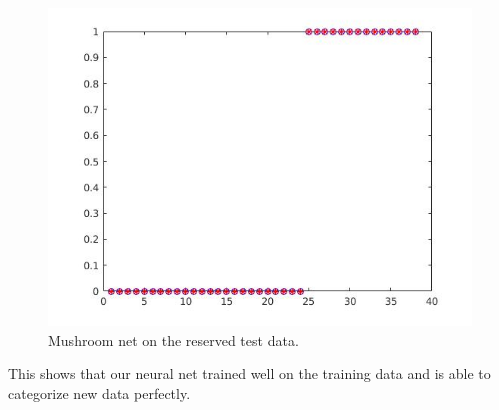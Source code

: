 \documentclass{article}%
\begin{document}
\begin{figure}[H]
\centering
\includegraphics[scale=0.5]{Images/mushtest.jpg}
\caption{Mushroom net on the reserved test data.}
\label{fig:mushtest}
\end{figure}
This shows that our neural net trained well on the training data and is able to categorize new data perfectly.
\end{document}
